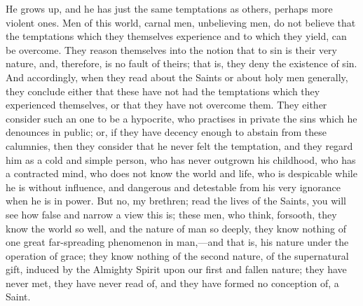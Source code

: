 He grows up, and he has just the same temptations as others,
perhaps more violent ones. Men of this world, carnal men, unbelieving
men, do not believe that the temptations which they themselves
experience and to which they yield, can be overcome. They reason
themselves into the notion that to sin is their very nature, and,
therefore, is no fault of theirs; that is, they deny the existence of
sin. And accordingly, when they read about the Saints or about holy
men generally, they conclude either that these have not had the
temptations which they experienced themselves, or that they have not
overcome them. They either consider such an one to be a hypocrite, who
practises in private the sins which he denounces in public; or, if
they have decency enough to abstain from these calumnies, then they
consider that he never felt the temptation, and they regard him as a
cold and simple person, who has never outgrown his childhood, who has
a contracted mind, who does not know the world and life, who is
despicable while he is without influence, and dangerous and detestable
from his very ignorance when he is in power. But no, my brethren; read
the lives of the Saints, you will see how false and narrow a view this
is; these men, who think, forsooth, they know the world so well, and
the nature of man so deeply, they know nothing of one great
far-spreading phenomenon in man,—and that is, his nature under the
operation of grace; they know nothing of the second nature, of the
supernatural gift, induced by the Almighty Spirit upon our first and
fallen nature; they have never met, they have never read of, and they
have formed no conception of, a Saint.

